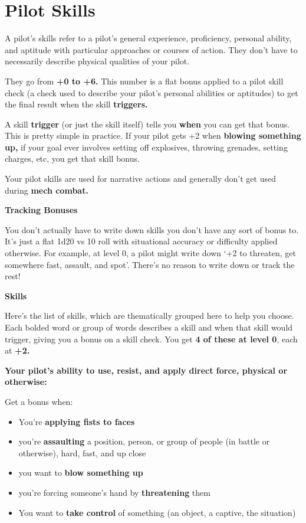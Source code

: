 \section{Pilot Skills}

A pilot's skills refer to a pilot's general experience, proficiency, personal ability, and aptitude with
particular approaches or courses of action. They don't have to necessarily describe physical
qualities of your pilot.

They go from \textbf{+0 to +6.} This number is a flat bonus applied to a pilot skill check (a check used to
describe your pilot's personal abilities or aptitudes) to get the final result
when the skill \textbf{triggers.} 

A skill \textbf{trigger} (or just the skill itself) tells you \textbf{when} you can get that bonus. This is pretty simple in
practice. If your pilot gets +2 when \textbf{blowing something up,} if your goal ever involves setting off
explosives, throwing grenades, setting charges, etc, you get that skill bonus.

Your pilot skills are used for narrative actions and generally don't get used during \textbf{mech combat.} 

\begin{center}
\textbf{Tracking Bonuses}
\end{center}


You don't actually have to write down skills you don't have any sort of bonus to. It's just a flat
1d20 vs 10 roll with situational accuracy or difficulty applied otherwise. For example, at level 0, a
pilot might write down `+2 to threaten, get somewhere fast, assault, and spot'. There's no reason
to write down or track the rest!


\begin{center}
\textbf{Skills}
\end{center}

Here's the list of skills, which are thematically grouped here to help you choose. Each bolded
word or group of words describes a skill and when that skill would trigger, giving you a bonus on a
skill check. You get \textbf{4 of these at level 0}, each at \textbf{+2.} 

\textbf{Your pilot's ability to use, resist, and apply direct force, physical or otherwise:}

Get a bonus when: 
\begin{itemize}
\item You're \textbf{applying fists to faces} 
\item you're \textbf{assaulting} a position, person, or group of people (in battle or otherwise), hard, fast, and up close
\item you want to \textbf{blow something up}
\item you're forcing someone's hand by \textbf{threatening} them
\item You want to \textbf{take control} of something (an object, a captive, the situation)
\end{itemize}  


